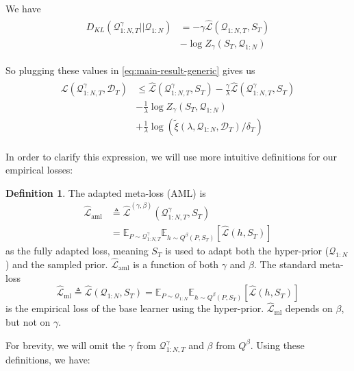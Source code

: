 \documentclass[letterpaper]{article} %
\theoremstyle{definition}
\newtheorem{defn}{Definition}[section]
\begin{document}
We have 
\begin{align*} 
\begin{split}
D_{KL}(\mathcal{Q}^{\gamma}_{1:N,T}||\mathcal{Q}_{1:N})&=
-\gamma\hat{\mathcal{L}}(\mathcal{Q}_{1:N,T}, S_T)\\
&-\log Z_\gamma(S_T, \mathcal{Q}_{1:N})
\end{split}
\end{align*}

So plugging these values in \eqref{eq:main-result-generic} gives us
\begin{align*} 
\begin{split}
\mathcal{L}(\mathcal{Q}^{\gamma}_{1:N,T}, \mathcal{D}_T) & \leq \hat{\mathcal{L}}(\mathcal{Q}^{\gamma}_{1:N,T}, S_T) -\frac{\gamma}{\lambda}\hat{\mathcal{L}}(\mathcal{Q}^{\gamma}_{1:N,T}, S_T) \\ &- \frac{1}{\lambda}\log Z_\gamma(S_T, \mathcal{Q}_{1:N})\\ &+\frac{1}{\lambda}\log\left (\tilde{\xi}(\lambda,\mathcal{Q}_{1:N},\mathcal{D}_T)/\delta_T\right )
\end{split}
\end{align*}

In order to clarify this expression, we will use more intuitive definitions for our empirical losses:
\begin{defn}
	The adapted meta-loss (AML) is  
	\begin{align*} 
	\hat{\mathcal{L}}_{\mathrm{aml}} &\triangleq  \hat{\mathcal{L}}^{(\gamma,\beta)}(\mathcal{Q}^{\gamma}_{1:N,T}, S_T)\\
	&=\mathbb{E}_{P\sim \mathcal{Q}^{\gamma}_{1:N,T}}\mathbb{E}_{h\sim Q^{\beta}(P,S_T)}\left [\hat{\mathcal{L}}(h, S_T)\right ]
	\end{align*} 
	as the fully adapted loss, meaning $S_T$ is used to adapt both the hyper-prior ($\mathcal{Q}_{1:N}$) and the sampled prior. $\hat{\mathcal{L}}_{\mathrm{aml}}$ is a function of both $\gamma$ and $\beta$. The standard meta-loss 
	$$
	\hat{\mathcal{L}}_{\mathrm{ml}}\triangleq \hat{\mathcal{L}}(\mathcal{Q}_{1:N}, S_T)=\mathbb{E}_{P\sim \mathcal{Q}_{1:N}}\mathbb{E}_{h\sim Q^{\beta}(P,S_T)}\left [\hat{\mathcal{L}}(h, S_T)\right ]
	$$ 
	is the empirical loss of the base learner using the hyper-prior. 
	$\hat{\mathcal{L}}_{\mathrm{ml}}$ depends on $\beta$, but not on $\gamma$.
\end{defn}

For brevity, we will omit the $\gamma$ from $\mathcal{Q}^{\gamma}_{1:N,T}$ and $\beta$ from $Q^{\beta}$. Using these definitions, we have:
\end{document}
